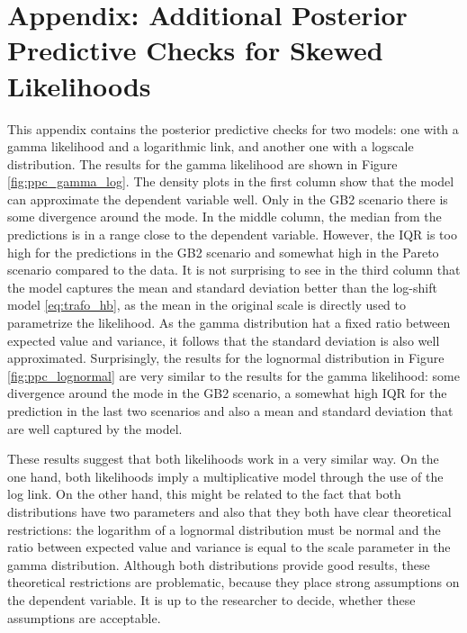 \chapter{Appendix: Additional Posterior Predictive Checks for Skewed Likelihoods}

This appendix contains the posterior predictive checks for two models: one with a gamma likelihood and a logarithmic link, and another one with a logscale distribution.
The results for the gamma likelihood are shown in Figure \ref{fig:ppc_gamma_log}.
The density plots in the first column show that the model can approximate the dependent variable well.
Only in the GB2 scenario there is some divergence around the mode.
In the middle column, the median from the predictions is in a range close to the dependent variable.
However, the IQR is too high for the predictions in the GB2 scenario and somewhat high in the Pareto scenario compared to the data.
It is not surprising to see in the third column that the model captures the mean and standard deviation better than the log-shift model \ref{eq:trafo_hb}, as the mean in the original scale is directly used to parametrize the likelihood.
As the gamma distribution hat a fixed ratio between expected value and variance, it follows that the standard deviation is also well approximated.
Surprisingly, the results for the lognormal distribution in Figure \ref{fig:ppc_lognormal} are very similar to the results for the gamma likelihood: some divergence around the mode in the GB2 scenario, a somewhat high IQR for the prediction in the last two scenarios and also a mean and standard deviation that are well captured by the model.

These results suggest that both likelihoods work in a very similar way.
On the one hand, both likelihoods imply a multiplicative model through the use of the log link.
On the other hand, this might be related to the fact that both distributions have two parameters and also that they both have clear theoretical restrictions: the logarithm of a lognormal distribution must be normal and the ratio between expected value and variance is equal to the scale parameter in the gamma distribution.
Although both distributions provide good results, these theoretical restrictions are problematic, because they place strong assumptions on the dependent variable.
It is up to the researcher to decide, whether these assumptions are acceptable.


